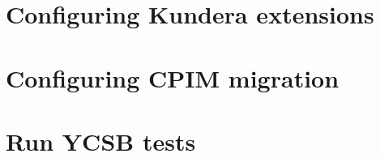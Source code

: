 \documentclass[12pt,a4paper,twoside,openright]{report}
\begin{document}
\chapter{Configuring Kundera extensions}
\label{app:kconfig}


\chapter{Configuring CPIM migration}
\label{app:migration}


\chapter{Run YCSB tests}
\label{app:ycsb}




\end{document}
